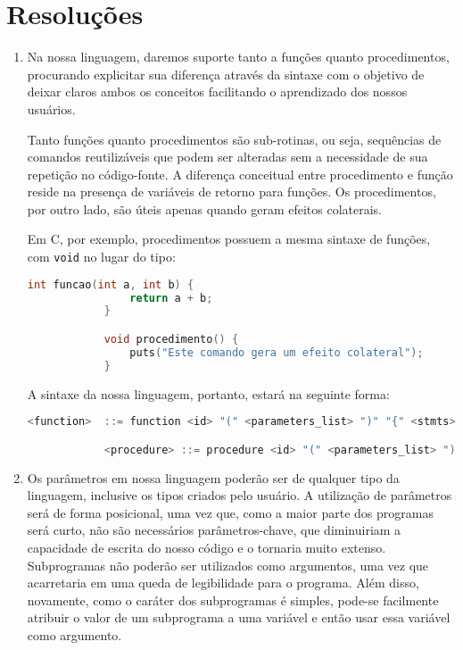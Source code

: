 \documentclass[12pt, a4paper]{article}
\begin{document}
\section{Resoluções}
    \begin{enumerate}
        \item
        Na nossa linguagem, daremos suporte tanto a funções quanto
        procedimentos, procurando explicitar sua diferença através da sintaxe
        com o objetivo de deixar claros ambos os conceitos facilitando o
        aprendizado dos nossos usuários.

        Tanto funções quanto procedimentos são sub-rotinas, ou seja, sequências
        de comandos reutilizáveis que podem ser alteradas sem a necessidade de
        sua repetição no código-fonte. A diferença conceitual entre
        procedimento e função reside na presença de variáveis de retorno para
        funções. Os procedimentos, por outro lado, são úteis apenas quando
        geram efeitos colaterais.

        Em C, por exemplo, procedimentos possuem a mesma sintaxe de funções,
        com \texttt{void} no lugar do tipo:

        \begin{lstlisting}[language=C]
            int funcao(int a, int b) {
                return a + b;
            }

            void procedimento() {
                puts("Este comando gera um efeito colateral");
            }
        \end{lstlisting}

        A sintaxe da nossa linguagem, portanto, estará na seguinte forma:

        \begin{lstlisting}[language=C]
            <function>  ::= function <id> "(" <parameters_list> ")" "{" <stmts> <return_stmt> "}"

            <procedure> ::= procedure <id> "(" <parameters_list> ")" "{" <stmts> "}"
        \end{lstlisting}

        \item
        Os parâmetros em nossa linguagem poderão ser de qualquer tipo da
        linguagem, inclusive os tipos criados pelo usuário. A utilização de
        parâmetros será de forma posicional, uma vez que, como a maior parte
        dos programas será curto, não são necessários parâmetros-chave, que
        diminuiriam a capacidade de escrita do nosso código e o tornaria muito
        extenso. Subprogramas não poderão ser utilizados como argumentos, uma
        vez que acarretaria em uma queda de legibilidade para o programa. Além
        disso, novamente, como o caráter dos subprogramas é simples, pode-se
        facilmente atribuir o valor de um subprograma a uma variável e então
        usar essa variável como argumento.


\end{enumerate}
\end{document}
